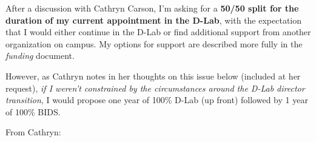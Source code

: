 




After a discussion with Cathryn Carson, I'm asking for a \textbf{50/50 split for
    the duration of my current appointment in the D-Lab}, with the expectation
that I would either continue in the D-Lab or find additional support from
another organization on campus. My options for support are described more fully
in the \emph{funding} document.

However, as Cathryn notes in her thoughts on this issue below (included at her
request), \emph{if I weren’t constrained by the circumstances around the D-Lab
director transition}, I would propose one year of 100\% D-Lab (up front) followed
by 1 year of 100\% BIDS.

From Cathryn:

